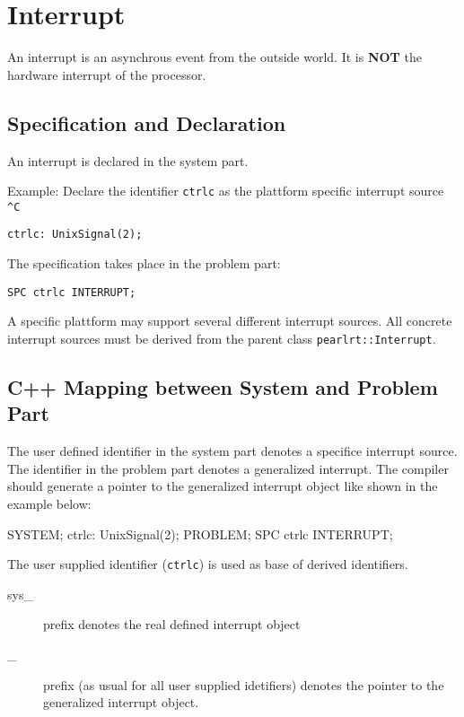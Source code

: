 \chapter{Interrupt}
An interrupt is an asynchrous event from the outside world.
It is {\bf NOT} the hardware interrupt of the processor.

\section{Specification and Declaration}
An interrupt is declared in the system part.

Example: Declare the identifier \verb|ctrlc| as the plattform specific
interrupt source \verb|^C|

\begin{verbatim}
ctrlc: UnixSignal(2);
\end{verbatim}

The specification takes place in the problem part:

\begin{verbatim}
SPC ctrlc INTERRUPT;
\end{verbatim}

A specific plattform may support several different interrupt sources.
All concrete interrupt sources must be derived from the parent class
\verb|pearlrt::Interrupt|.


\section{C++ Mapping between System and Problem Part}
The user defined identifier in the system part denotes a specifice interrupt
source. The identifier in the problem part denotes a generalized interrupt.
The compiler should generate a pointer to the generalized interrupt object like
shown in the example below:

\begin{PEARLCode}
SYSTEM;
  ctrlc: UnixSignal(2);
PROBLEM;
   SPC ctrlc INTERRUPT;
\end{PEARLCode}

The user supplied identifier (\verb|ctrlc|) is used as base of derived
identifiers.
\begin{description}
\item[sys\_] prefix denotes the real defined interrupt object 
\item[\_] prefix (as usual for all user supplied idetifiers) denotes the
    pointer to the generalized interrupt object.
\end{description}

